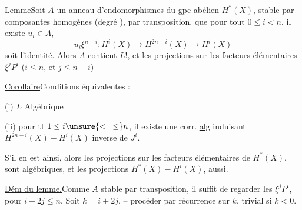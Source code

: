 
\uline{Lemme}\quad Soit $A$ un anneau d'endomorphismes du gpe abélien $H^*(X)$, stable par composantes homogènes (degré ), par transposition.   que pour tout $0\leq i<n$, il existe $u_i\in A$, 
\[
u_i\xi^{n-i}:H^i(X)\longrightarrow H^{2n-i}(X)\longrightarrow H^{i}(X)
\]
soit l'identité.
Alors $A$ contient $L$!,  et les projections sur les facteurs élémentaires $\xi^jP^i$ ($i\leq n$, et  $j\leq n-i$)

\uline{Corollaire}\quad Conditions équivalentes :

(i) $L$ Algébrique

(ii) pour tt $1\leq i\unsure{<|\leq}n$, il existe une corr. \uline{alg} induisant $H^{2n-i}(X)\mathbin{-}H^i(X)$ inverse de $J^i$.

 S'il en est ainsi, alors les \deleted{$\unsure{\xi}$} projections sur les facteurs élémentaires de $H^*(X)$, sont algébriques, et les projections $H^*(X)\mathbin{-}H^i(X)$, aussi.

\uline{Dém du lemme.}\quad Comme $A$ stable par transposition, il suffit de regarder les $\xi^jP^i$, pour $i+2j\leq n$. Soit $k=i+2j$. -- procéder par récurrence sur $k$, trivial si $k<0$.

